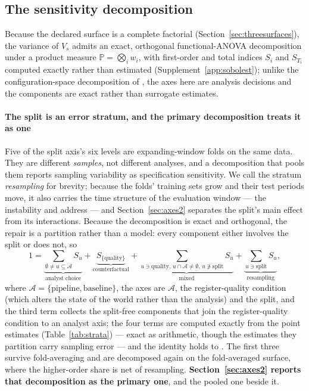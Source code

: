 \documentclass[11pt,3p,review,authoryear]{elsarticle}
\theoremstyle{definition}
\begin{document}
\subsection{The sensitivity decomposition}
\label{sec:sobol}

Because the declared surface is a complete factorial
(Section~\ref{sec:threesurfaces}), the variance of $V_s$ admits an exact,
orthogonal functional-ANOVA decomposition
\citep{sobol2001global,saltelli2010variance} under a product measure
$\mathbb{P} = \bigotimes_i w_i$, with first-order and total indices $S_i$ and
$S_{T_i}$ computed exactly rather than estimated
(Supplement~\ref{app:sobolest}); unlike the configuration-space
decomposition of \citet{hutter2014efficient}, the axes here are analysis
decisions and the components are exact rather than surrogate estimates.

\paragraph{The split is an error stratum, and the primary decomposition treats
it as one}
Five of the split axis's six levels are expanding-window folds on the same
data. They are different \emph{samples}, not different analyses, and a
decomposition that pools them reports sampling variability as specification
sensitivity. We call the stratum \emph{resampling} for brevity; because the
folds' training sets grow and their test periods move, it also carries the
time structure of the evaluation window --- the instability
\citet{giacomini2010unstable} and \citet{rossi2012window} address ---
and Section~\ref{sec:axes2} separates the split's main effect from its
interactions. Because the decomposition is exact and orthogonal, the repair is
a partition rather than a model: every component either involves the split or
does not, so
\begin{equation}
\label{eq:strata}
1 = \underbrace{\textstyle\sum_{\emptyset \neq u \subseteq \mathcal{A}} S_u}_{\text{analyst choice}}
+ \underbrace{S_{\{\text{quality}\}}}_{\text{counterfactual}}
+ \underbrace{\textstyle\sum_{u \ni \text{quality},\, u \cap \mathcal{A} \neq \emptyset,\, u \not\ni \text{split}} S_u}_{\text{mixed}}
+ \underbrace{\textstyle\sum_{u \ni \text{split}} S_u}_{\text{resampling}},
\end{equation}
where $\mathcal{A} = \{\text{pipeline}, \text{baseline}\}$, the axes are
$\mathcal{A}$, the register-quality condition (which alters the state of the
world rather than the analysis) and the split, and the third term collects
the split-free components that join the register-quality condition to an
analyst axis; the four terms are computed exactly from the point estimates
(Table~\ref{tab:strata}) --- exact as arithmetic, though the estimates they
partition carry sampling error --- and the identity holds to \stratumPartitionError.
The first three survive fold-averaging and are decomposed again on the
fold-averaged surface, where the higher-order share is net of resampling.
\textbf{Section~\ref{sec:axes2} reports that decomposition as the primary
one}, and the pooled one beside it.
\end{document}
